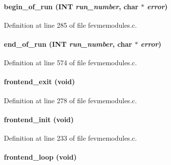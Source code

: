 \paragraph[{begin\_\-of\_\-run}]{ begin\_\-of\_\-run ({\bf INT} {\em run\_\-number}, \/  char $\ast$ {\em error})}\hfill\label{fevmemodules_8c_ad8bfe703c49342b9f0275aba77dc7758}


Definition at line 285 of file fevmemodules.c.
\paragraph[{end\_\-of\_\-run}]{ end\_\-of\_\-run ({\bf INT} {\em run\_\-number}, \/  char $\ast$ {\em error})}\hfill\label{fevmemodules_8c_ae6d798649008b7523c77222bae2d4187}


Definition at line 574 of file fevmemodules.c.
\paragraph[{frontend\_\-exit}]{ frontend\_\-exit (void)}\hfill\label{fevmemodules_8c_a15271255cca6c92978b28afd5a548382}


Definition at line 278 of file fevmemodules.c.
\paragraph[{frontend\_\-init}]{ frontend\_\-init (void)}\hfill\label{fevmemodules_8c_a34c51ae8c88f4717087b0604975516f4}


Definition at line 233 of file fevmemodules.c.
\paragraph[{frontend\_\-loop}]{ frontend\_\-loop (void)}\hfill\label{fevmemodules_8c_ada66837c3c3d263974ad717921145e0a}


